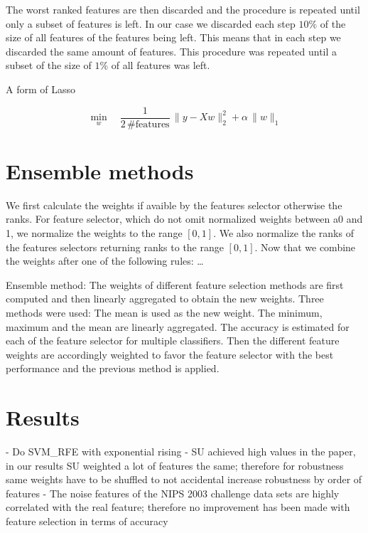 \documentclass[twoside,11pt]{article}
\begin{document}
The worst ranked features are then discarded and the procedure is repeated until only a subset of features is left.
In our case we discarded each step $10\%$ of the size of all features of the features being left. This means that
in each step we discarded the same amount of features. This procedure was repeated until a subset of the size
of $1\%$ of all features was left.

A form of Lasso

\begin{equation}
  \min_w \quad \frac1{2 \, \textrm{\#features}} \, \|y - Xw\|^2_2 + \alpha \, \|w\|_1
\end{equation}


\section{Ensemble methods}
We first calculate the weights if avaible by the features selector otherwise the ranks.
For feature selector, which do not omit normalized weights between a0 and 1, we normalize
the weights to the range $[0,1]$. We also normalize the ranks of the features selectors returning
ranks to the range $[0,1]$. Now that we combine the weights after one of the following rules: \ldots

Ensemble method: The weights of different feature selection methods are first computed and then linearly aggregated to obtain the new weights. Three methods were used:
The mean is used as the new weight.
The minimum, maximum and the mean are linearly aggregated.
The accuracy is estimated for each of the feature selector for multiple classifiers. Then the different feature weights are accordingly weighted to favor the feature selector with the best performance and the previous method is applied.


\section{Results}
- Do SVM\_RFE with exponential rising
- SU achieved high values in the paper, in our results SU weighted a lot of features the 
same; therefore for robustness same weights have to be shuffled to not accidental increase
robustness by order of features
- The noise features of the NIPS 2003 challenge data sets are highly correlated with the
real feature; therefore no improvement has been made with feature selection in terms of 
accuracy
\end{document}
